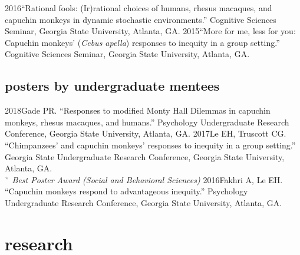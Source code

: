 \documentclass[]{friggeri-cv}
\begin{document}
\begin{entrylist2}
  \entrytwo
    {2016}{``Rational fools: (Ir)rational choices of humans, rhesus macaques, and capuchin monkeys in dynamic stochastic environments.'' Cognitive Sciences Seminar, Georgia State University, Atlanta, GA.}
  \entrytwo
    {2015}{``More for me, less for you: Capuchin monkeys' (\emph{Cebus apella}) responses to inequity in a group setting.'' Cognitive Sciences Seminar, Georgia State University, Atlanta, GA.}
\end{entrylist2}


\subsection{posters by undergraduate mentees}

\begin{entrylist2}
  \entrytwo
    {2018}{Gade PR. ``Responses to modified Monty Hall Dilemmas in capuchin monkeys, rhesus macaques, and humans.'' Psychology Undergraduate Research Conference, Georgia State University, Atlanta, GA.}
  \entrytwo
    {2017}{Le EH, Truscott CG. ``Chimpanzees' and capuchin monkeys' responses to inequity in a group setting.'' Georgia State Undergraduate Research Conference, Georgia State University, Atlanta, GA.\\
    {\quad\small{} $\color{lightgray} {}^\star$ \emph{\color{lightgray} Best Poster Award (Social and Behavioral Sciences)}}}
  \entrytwo
    {2016}{Fakhri A, Le EH. ``Capuchin monkeys respond to advantageous inequity.'' Psychology Undergraduate Research Conference, Georgia State University, Atlanta, GA.}
\end{entrylist2}


\section{research}
\end{document}
